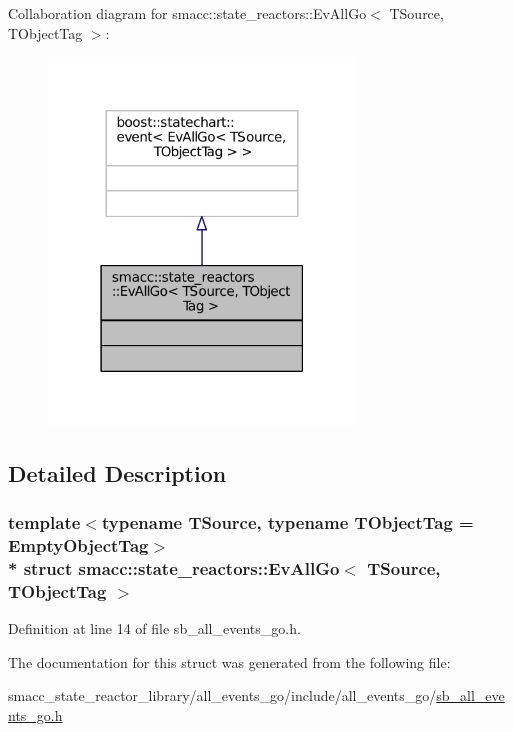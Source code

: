 Collaboration diagram for smacc\+:\+:state\+\_\+reactors\+:\+:Ev\+All\+Go$<$ T\+Source, T\+Object\+Tag $>$\+:
\nopagebreak
\begin{figure}[H]
\begin{center}
\leavevmode
\includegraphics[width=231pt]{structsmacc_1_1state__reactors_1_1EvAllGo__coll__graph}
\end{center}
\end{figure}


\subsection{Detailed Description}
\subsubsection*{template$<$typename T\+Source, typename T\+Object\+Tag = Empty\+Object\+Tag$>$\\*
struct smacc\+::state\+\_\+reactors\+::\+Ev\+All\+Go$<$ T\+Source, T\+Object\+Tag $>$}



Definition at line 14 of file sb\+\_\+all\+\_\+events\+\_\+go.\+h.



The documentation for this struct was generated from the following file\+:\begin{DoxyCompactItemize}
\item 
smacc\+\_\+state\+\_\+reactor\+\_\+library/all\+\_\+events\+\_\+go/include/all\+\_\+events\+\_\+go/\hyperlink{sb__all__events__go_8h}{sb\+\_\+all\+\_\+events\+\_\+go.\+h}\end{DoxyCompactItemize}
